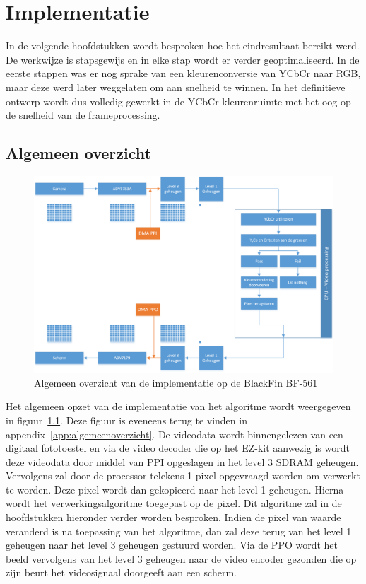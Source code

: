 \newpage
\chapter{Implementatie}

\par In de volgende hoofdstukken wordt besproken hoe het eindresultaat bereikt werd. De werkwijze is stapsgewijs en in elke stap wordt er verder geoptimaliseerd. In de eerste stappen was er nog sprake van een kleurenconversie van YCbCr naar RGB, maar deze werd later weggelaten om aan snelheid te winnen. In het definitieve ontwerp wordt dus volledig gewerkt in de YCbCr kleurenruimte met het oog op de snelheid van de frameprocessing.

\section{Algemeen overzicht}

	\begin{figure}[H]
			\centering
			\includegraphics[width=1.0\textwidth]{Chapters/Chapter2/Images/implementationOverview.png}
			\caption{Algemeen overzicht van de implementatie op de BlackFin BF-561}
			\label{fig:algemeenoverzicht}
	\end{figure}
	\newpage
	\par Het algemeen opzet van de implementatie van het algoritme wordt weergegeven in figuur~\ref{fig:algemeenoverzicht}. Deze figuur is eveneens terug te vinden in appendix~\ref{app:algemeenoverzicht}. De videodata wordt binnengelezen van een digitaal fototoestel en via de video decoder die op het EZ-kit aanwezig is wordt deze videodata door middel van PPI opgeslagen in het level 3 SDRAM geheugen. Vervolgens zal door de processor telekens 1 pixel opgevraagd worden om verwerkt te worden. Deze pixel wordt dan gekopieerd naar het level 1 geheugen. Hierna wordt het verwerkingsalgoritme toegepast op de pixel. Dit algoritme zal in de hoofdstukken hieronder verder worden besproken. Indien de pixel van waarde veranderd is na toepassing van het algoritme, dan zal deze terug van het level 1 geheugen naar het level 3 geheugen gestuurd worden. Via de PPO wordt het beeld vervolgens van het level 3 geheugen naar de video encoder gezonden die op zijn beurt het videosignaal doorgeeft aan een scherm.

